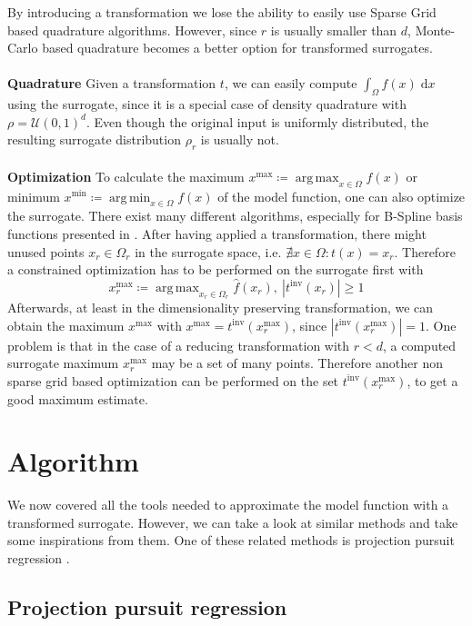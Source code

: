 \documentclass[
  a4paper,  %
  twoside,  %
  bibliography=totoc,
  headsepline,
  cleardoublepage=empty,
  parskip=half,
  draft=false
]{scrbook}
\DeclareMathOperator*{\argmin}{arg\,min}
\DeclareMathOperator*{\argmax}{arg\,max}
\begin{document}
By introducing a transformation we lose the ability to easily use Sparse Grid based quadrature algorithms.
However, since $r$ is usually smaller than $d$, Monte-Carlo based quadrature becomes a better option for transformed surrogates.
\\
\\
\textbf{Quadrature}
Given a transformation $t$, we can easily compute $\int_{\Omega} f(x) \; \text{d}x$ using the surrogate, since it is a special case of density quadrature with $\rho=\mathcal{U}(0,1)^d$.
Even though the original input is uniformly distributed, the resulting surrogate distribution $\rho_r$ is usually not.
\\
\\
\textbf{Optimization}
To calculate the maximum $x^\text{max} \coloneqq \argmax_{x \in \Omega} f(x)$ or minimum $x^\text{min} \coloneqq \argmin_{x \in \Omega} f(x)$ of the model function, one can also optimize the surrogate. There exist many different algorithms, especially for B-Spline basis functions presented in \cite{}.
After having applied a transformation, there might unused points $x_r \in \Omega_r$ in the surrogate space, i.e. $\nexists x \in \Omega \colon t(x)=x_r$.
Therefore a constrained optimization has to be performed on the surrogate first with
\begin{equation}
x_{r}^\text{max} \coloneqq \argmax_{x_r \in \Omega_r} \hat{f}(x_r), ~ |t^{\text{inv}}(x_{r})|\geq 1
\end{equation}
Afterwards, at least in the dimensionality preserving transformation, we can obtain the maximum $x^\text{max}$ with $x^\text{max}=t^{\text{inv}}(x_{r}^\text{max})$, since $|t^{\text{inv}}(x_{r}^\text{max})|=1$.
One problem is that in the case of a reducing transformation with $r<d$, a computed surrogate maximum $x_{r}^\text{max}$ may be a set of many points.
Therefore another non sparse grid based optimization can be performed on the set $t^{\text{inv}}(x_{r}^\text{max})$, to get a good maximum estimate.

\chapter{Algorithm}

We now covered all the tools needed to approximate the model function with a transformed surrogate.
However, we can take a look at similar methods and take some inspirations from them.
One of these related methods is projection pursuit regression \cite{}.

\section{Projection pursuit regression}
\end{document}
